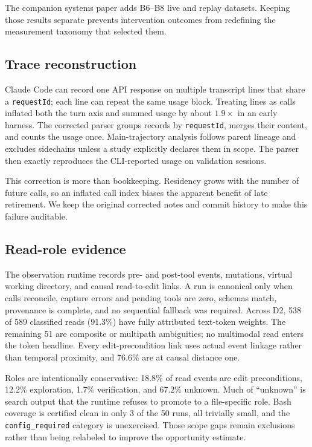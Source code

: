 \documentclass[10pt,twocolumn]{article}
\begin{document}
The companion systems paper adds B6--B8 live and replay datasets.  Keeping those results separate
prevents intervention outcomes from redefining the measurement taxonomy that selected them.

\subsection{Trace reconstruction}

Claude Code can record one API response on multiple transcript lines that share a \texttt{requestId};
each line can repeat the same usage block.  Treating lines as calls inflated both the turn axis and
summed usage by about $1.9\times$ in an early harness.  The corrected parser groups records by
\texttt{requestId}, merges their content, and counts the usage once.  Main-trajectory analysis follows
parent lineage and excludes sidechains unless a study explicitly declares them in scope.  The parser
then exactly reproduces the CLI-reported usage on validation sessions.

This correction is more than bookkeeping.  Residency grows with the number of future calls, so an
inflated call index biases the apparent benefit of late retirement.  We keep the original corrected
notes and commit history to make this failure auditable.

\subsection{Read-role evidence}

The observation runtime records pre- and post-tool events, mutations, virtual working directory, and
causal read-to-edit links.  A run is canonical only when calls reconcile, capture errors and pending
tools are zero, schemas match, provenance is complete, and no sequential fallback was required.
Across D2, 538 of 589 classified reads (91.3\%) have fully attributed text-token weights.  The
remaining 51 are composite or multipath ambiguities; no multimodal read enters the token headline.
Every edit-precondition link uses actual event linkage rather than temporal proximity, and 76.6\% are
at causal distance one.

Roles are intentionally conservative: 18.8\% of read events are edit preconditions, 12.2\%
exploration, 1.7\% verification, and 67.2\% unknown.  Much of ``unknown'' is search output that the
runtime refuses to promote to a file-specific role.  Bash coverage is certified clean in only 3 of
the 50 runs, all trivially small, and the \texttt{config\_required} category is unexercised.  Those
scope gaps remain exclusions rather than being relabeled to improve the opportunity estimate.
\end{document}

